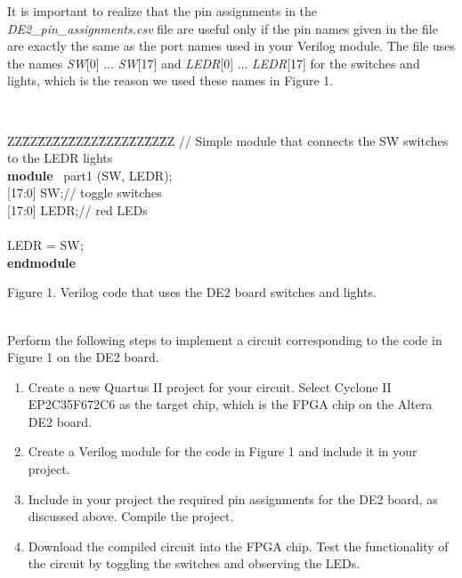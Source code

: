 \documentclass[psfig,10pt,fullpage]{article}
\begin{document}
It is important to realize that the pin assignments in the {\it DE2\_pin\_assignments.csv}
file are useful only if the pin names given in the file are exactly the same as the port names
used in your Verilog module. The file uses the names {\it SW}[0] $\ldots$ {\it SW}[17] 
and {\it LEDR}[0] $\ldots$ {\it LEDR}[17] for the switches and lights, which is the reason
we used these names in Figure 1.

~\\
\begin{center}
\begin{minipage}[t]{12.5 cm}
\begin{tabbing}
ZZ\=ZZ\=ZZ\=ZZ\=ZZ\=ZZ\=ZZ\=ZZ\=ZZ\=ZZ\=ZZ\kill
// Simple module that connects the SW switches to the LEDR lights\\
{\bf module} ~part1 (SW, LEDR);\\
 [17:0] SW;\>\>\>\>\>\>\>\>// toggle switches\\
 [17:0] LEDR;\>\>\>\>\>\>\>\>// red LEDs\\
~\\
 LEDR = SW;\\
{\bf endmodule}
\end{tabbing}
\end{minipage}
\end{center}

\begin{center}
Figure 1. Verilog code that uses the DE2 board switches and lights.
\end{center}

~\\
Perform the following steps to implement a circuit corresponding to the code
in Figure 1 on the DE2 board.
\begin{enumerate}
\item Create a new Quartus II project for your circuit. Select Cyclone II EP2C35F672C6
as the target chip, which is the FPGA chip on the Altera DE2 board. 
\item Create a Verilog module for the code in Figure 1 and include it in your project.
\item Include in your project the required pin assignments for the DE2 board, as discussed
above. Compile the project.
\item Download the compiled circuit into the FPGA chip. Test the functionality of the 
circuit by toggling the switches and observing the LEDs.
\end{enumerate}
\end{document}
